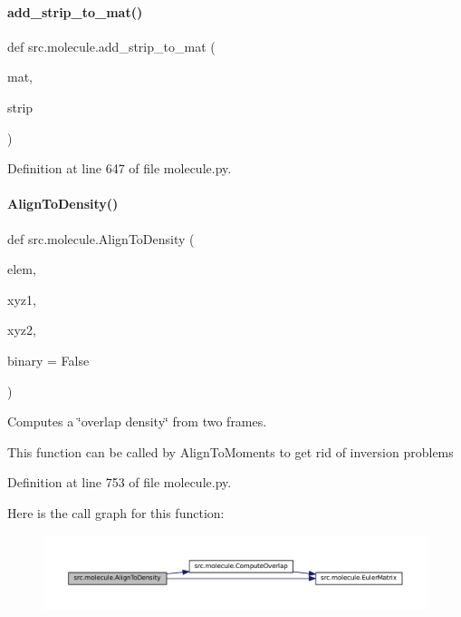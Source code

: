 \paragraph{\texorpdfstring{add\+\_\+strip\+\_\+to\+\_\+mat()}{add\_strip\_to\_mat()}}
{\footnotesize\ttfamily def src.\+molecule.\+add\+\_\+strip\+\_\+to\+\_\+mat (\begin{DoxyParamCaption}\item[{}]{mat,  }\item[{}]{strip }\end{DoxyParamCaption})}



Definition at line 647 of file molecule.\+py.

\mbox{\label{namespacesrc_1_1molecule_af5506b829909137d2b0b586eb1349c85}} 
\paragraph{\texorpdfstring{Align\+To\+Density()}{AlignToDensity()}}
{\footnotesize\ttfamily def src.\+molecule.\+Align\+To\+Density (\begin{DoxyParamCaption}\item[{}]{elem,  }\item[{}]{xyz1,  }\item[{}]{xyz2,  }\item[{}]{binary = {\ttfamily False} }\end{DoxyParamCaption})}



Computes a \char`\"{}overlap density\char`\"{} from two frames. 

This function can be called by Align\+To\+Moments to get rid of inversion problems 

Definition at line 753 of file molecule.\+py.

Here is the call graph for this function\+:
\nopagebreak
\begin{figure}[H]
\begin{center}
\leavevmode
\includegraphics[width=350pt]{namespacesrc_1_1molecule_af5506b829909137d2b0b586eb1349c85_cgraph}
\end{center}
\end{figure}
\mbox{\label{namespacesrc_1_1molecule_a06bd27c59ccdbde31fbefbdec2daf1ad}} 
